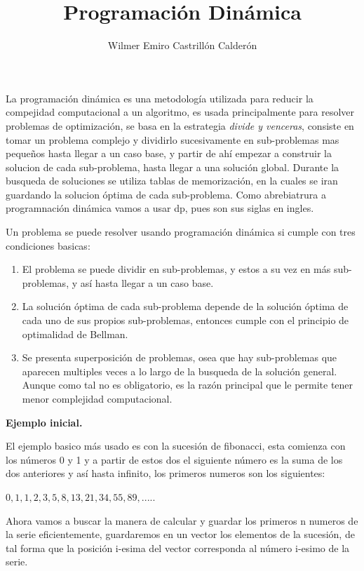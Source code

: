 \documentclass[12pt, a4paper]{article}
\title{\textbf{Programación Dinámica}}
\author{Wilmer Emiro Castrillón Calderón}
\newcommand{\subtitulo}[1]{\begin{center}\textbf{#1}\end{center}}
\begin{document}
	\maketitle
	
	La programación dinámica es una metodología utilizada para reducir la compejidad computacional a un
	algoritmo, es usada principalmente para resolver problemas de optimización,
	se basa en la estrategia \textit{divide y venceras}, consiste en tomar un problema complejo y dividirlo 
	sucesivamente en sub-problemas mas pequeños hasta llegar a un caso base, y partir de ahí empezar a construir la
	solucion de cada sub-problema, hasta llegar a una solución global. Durante la busqueda de soluciones
	se utiliza tablas de memorización, en la cuales se iran guardando la solucion óptima de cada sub-problema.
	Como abrebiatrura a programnación dinámica vamos a usar dp, pues son sus siglas en ingles.
	
	Un problema se puede resolver usando programación dinámica si cumple con tres condiciones basicas:
	\begin{enumerate}[1.]
		\item El problema se puede dividir en sub-problemas, y estos a su vez en más sub-problemas, y así hasta llegar
				a un caso base.
		\item La solución óptima de cada sub-problema depende de la solución óptima de cada uno de sus
				propios sub-problemas, entonces cumple con el principio de optimalidad de Bellman.
		\item Se presenta superposición de problemas, osea que hay sub-problemas que aparecen multiples veces
		 		a lo largo de la busqueda de la solución general. Aunque como tal no es obligatorio, es la razón 
		 		principal que le permite tener menor complejidad computacional.
	\end{enumerate}
	
	\subtitulo{Ejemplo inicial.}
	
	El ejemplo basico más usado es con la sucesión de fibonacci, esta comienza con los números 0 y 1 y a partir
	de estos dos el siguiente número es la suma de los dos anteriores y así hasta infinito, los primeros
	numeros son los siguientes:
	\begin{center} $0, 1, 1, 2, 3, 5, 8, 13, 21, 34, 55, 89, ..... $ \end{center}
	
	Ahora vamos a buscar la manera de calcular y guardar los primeros n numeros de la serie eficientemente, 
	guardaremos en un vector los elementos de la sucesión, de tal forma que la posición i-esima del vector
	corresponda al número i-esimo de la serie.
	
\end{document}
